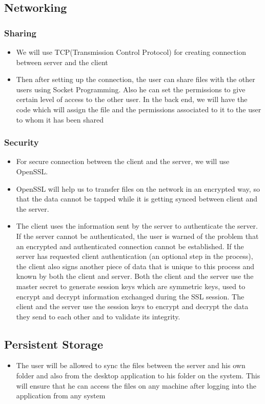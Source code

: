 \documentclass{article}
\begin{document}
		\subsection{Networking}
			\subsubsection{Sharing}
				\begin{itemize}
					\item We will use TCP(Transmission Control Protocol) for creating connection between server and the client
					\item Then after setting up the connection, the user can share files with the other users using Socket Programming. Also he can set the permissions to give certain level of access to the other user. In the back end, we will have the code which will assign the file and the permissions associated to it to the user to whom it has been shared
				\end{itemize}
			\subsubsection{Security}
				\begin{itemize}
					\item For secure connection between the client and the server, we will use OpenSSL.
					\item OpenSSL will help us to transfer files on the network in an encrypted way, so that the data cannot be tapped while it is getting synced between client and the server.
					\item The client uses the information sent by the server to authenticate the server. If the server cannot be authenticated, the user is warned of the problem that an encrypted and authenticated connection cannot be established. If the server has requested client authentication (an optional step in the process), the client also signs another piece of data that is unique to this process and known by both the client and server. Both the client and the server use the master secret to generate session keys which are symmetric keys, used to encrypt and decrypt information exchanged during the SSL session. The client and the server use the session keys to encrypt and decrypt the data they send to each other and to validate its integrity.
					
					
				\end{itemize}
		\subsection{Persistent Storage}
			\begin{itemize}
				\item The user will be allowed to sync the files between the server and his own folder and also from the desktop application to his folder on the system. This will ensure that he can access the files on any machine after logging into the application from any system
				
			\end{itemize}
\end{document}
